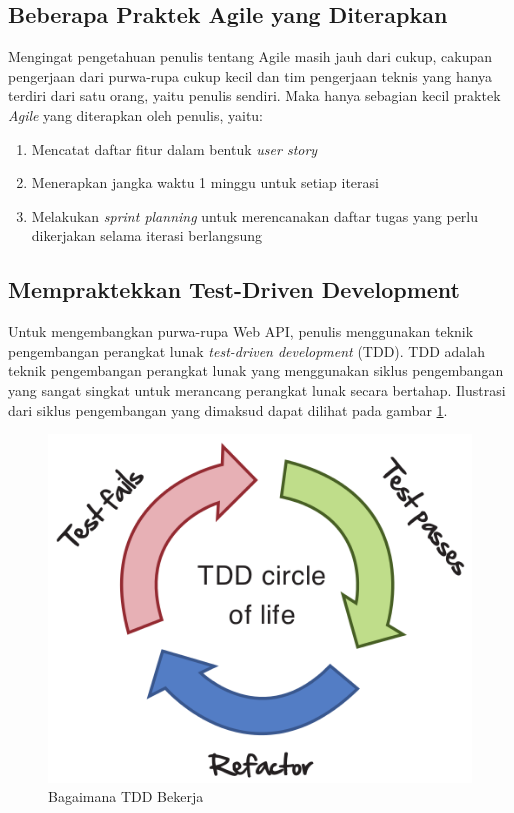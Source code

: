 \documentclass[a4paper, 12pt, oneside]{report}
\begin{document}
\subsection{Beberapa Praktek Agile yang Diterapkan}

\onehalfspacing Mengingat pengetahuan penulis tentang Agile masih jauh dari cukup, cakupan pengerjaan dari purwa-rupa cukup kecil dan tim pengerjaan teknis yang hanya terdiri dari satu orang, yaitu penulis sendiri. Maka hanya sebagian kecil praktek \textit{Agile} yang diterapkan oleh penulis, yaitu:

\begin{enumerate}
  \item Mencatat daftar fitur dalam bentuk \textit{user story}
  \item Menerapkan jangka waktu 1 minggu untuk setiap iterasi
  \item Melakukan \textit{sprint planning} untuk merencanakan daftar tugas yang perlu dikerjakan selama iterasi berlangsung
\end{enumerate}

\subsection{Mempraktekkan Test-Driven Development}

\onehalfspacing Untuk mengembangkan purwa-rupa Web API, penulis menggunakan teknik pengembangan perangkat lunak \textit{test-driven development} (TDD). TDD adalah teknik pengembangan perangkat lunak yang menggunakan siklus pengembangan yang sangat singkat untuk merancang perangkat lunak secara bertahap. Ilustrasi dari siklus pengembangan yang dimaksud dapat dilihat pada gambar \ref{tdd-cycle}.

\begin{figure}[htp]
\centering
\includegraphics[scale=0.46]{images/tdd-cycle.png}
\caption{Bagaimana TDD Bekerja \cite{agile-samurai}}
\label{tdd-cycle}
\end{figure}
\end{document}
